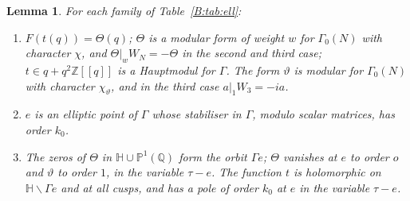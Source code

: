 \documentclass[11pt,a4paper]{article}
\newtheorem{lemma}[theorem]{Lemma}
\theoremstyle{definition}\newtheorem{definition}[theorem]{Definition}
\theoremstyle{remark}\newtheorem{remark}[theorem]{Remark}
\newcommand{\Z}{\mathbb Z}
\newcommand{\Q}{\mathbb Q}
\newcommand{\Hb}{\mathbb H}
\numberwithin{equation}{section}
\begin{document}
\begin{lemma}\label{B:lem:elldata}
For each family of Table~\ref{B:tab:ell}:
\begin{enumerate}[label=\textup{(\alph*)}]
\item $F(t(q))=\Theta(q)$; $\Theta$ is a modular form of weight $w$ for $\Gamma_0(N)$ with character $\chi$, and
$\Theta|_wW_N=-\Theta$ in the second and third case; $t\in q+q^2\Z[[q]]$ is a Hauptmodul for $\Gamma$. The form
$\vartheta$ is modular for $\Gamma_0(N)$ with character $\chi_\vartheta$, and in the third case $a|_1W_3=-ia$.
\item $e$ is an elliptic point of $\Gamma$ whose stabiliser in $\Gamma$, modulo scalar matrices, has order $k_0$.
\item The zeros of $\Theta$ in $\Hb\cup\mathbb P^1(\Q)$ form the orbit $\Gamma e$; $\Theta$ vanishes at $e$ to order $o$
and $\vartheta$ to order $1$, in the variable $\tau-e$. The function $t$ is holomorphic on $\Hb\smallsetminus\Gamma e$
and at all cusps, and has a pole of order $k_0$ at $e$ in the variable $\tau-e$.
\end{enumerate}
\end{lemma}
\end{document}
